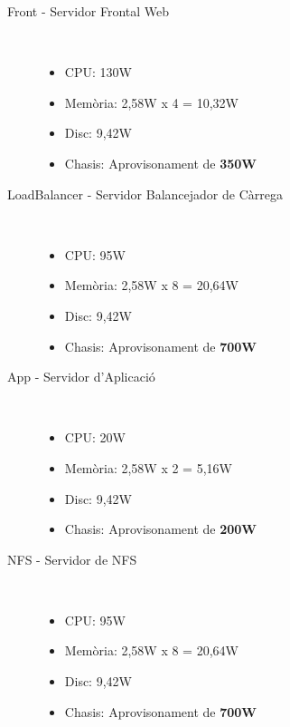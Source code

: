 \begin{description}
\item[Front - Servidor Frontal Web] \hfill \\
        \vspace{-5mm}
        \begin{itemize}[leftmargin=*]
            \item CPU: 130W
            \item Memòria: 2,58W x 4 = 10,32W
            \item Disc: 9,42W
            \item Chasis: Aprovisonament de \textbf{350W}
        \end{itemize}
    
    \item[LoadBalancer - Servidor Balancejador de Càrrega] \hfill \\
        \vspace{-5mm}
        \begin{itemize}[leftmargin=*]
            \item CPU: 95W
            \item Memòria: 2,58W x 8 = 20,64W
            \item Disc: 9,42W
            \item Chasis: Aprovisonament de \textbf{700W}
        \end{itemize}
        
    \item[App - Servidor d'Aplicació] \hfill \\
        \vspace{-5mm}
        \begin{itemize}[leftmargin=*]
            \item CPU: 20W
            \item Memòria: 2,58W x 2 = 5,16W
            \item Disc: 9,42W
            \item Chasis: Aprovisonament de \textbf{200W}
        \end{itemize}
        
    \item[NFS - Servidor de NFS] \hfill \\
        \vspace{-5mm}
        \begin{itemize}[leftmargin=*]
            \item CPU: 95W
            \item Memòria: 2,58W x 8 = 20,64W
            \item Disc: 9,42W
            \item Chasis: Aprovisonament de \textbf{700W}
        \end{itemize}
        

\end{description}
